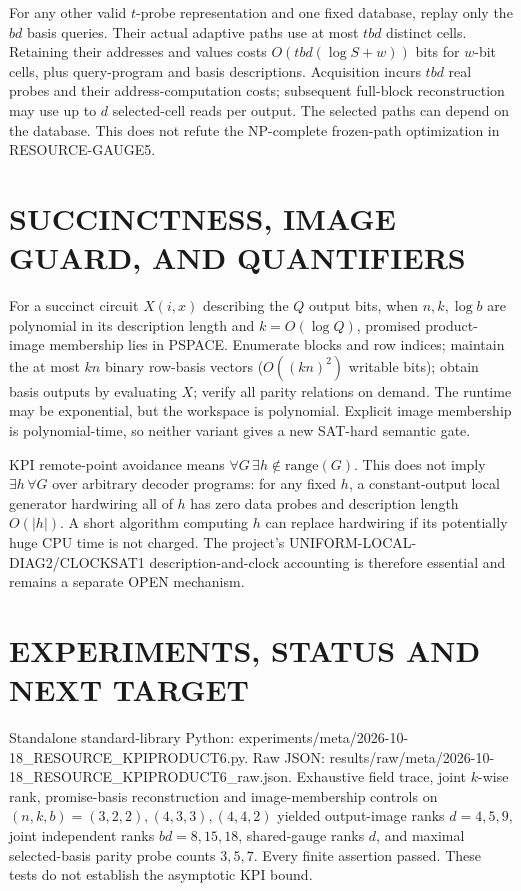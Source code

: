 \documentclass[11pt]{article}
\begin{document}
For any other valid $t$-probe representation and one fixed database, replay only the $bd$ basis queries. Their actual adaptive paths use at most $tbd$ distinct cells. Retaining their addresses and values costs $O(tbd(\log S+w))$ bits for $w$-bit cells, plus query-program and basis descriptions. Acquisition incurs $tbd$ real probes and their address-computation costs; subsequent full-block reconstruction may use up to $d$ selected-cell reads per output. The selected paths can depend on the database. This does not refute the NP-complete frozen-path optimization in RESOURCE-GAUGE5.

\section{SUCCINCTNESS, IMAGE GUARD, AND QUANTIFIERS}
For a succinct circuit $X(i,x)$ describing the $Q$ output bits, when $n,k,\log b$ are polynomial in its description length and $k=O(\log Q)$, promised product-image membership lies in PSPACE. Enumerate blocks and row indices; maintain the at most $kn$ binary row-basis vectors ($O((kn)^2)$ writable bits); obtain basis outputs by evaluating $X$; verify all parity relations on demand. The runtime may be exponential, but the workspace is polynomial. Explicit image membership is polynomial-time, so neither variant gives a new SAT-hard semantic gate.

KPI remote-point avoidance means $\forall G\,\exists h\notin\mathrm{range}(G)$. This does not imply $\exists h\,\forall G$ over arbitrary decoder programs: for any fixed $h$, a constant-output local generator hardwiring all of $h$ has zero data probes and description length $O(|h|)$. A short algorithm computing $h$ can replace hardwiring if its potentially huge CPU time is not charged. The project's UNIFORM-LOCAL-DIAG2/CLOCKSAT1 description-and-clock accounting is therefore essential and remains a separate OPEN mechanism.

\section{EXPERIMENTS, STATUS AND NEXT TARGET}
Standalone standard-library Python: experiments/meta/2026-10-18_RESOURCE_KPIPRODUCT6.py. Raw JSON: results/raw/meta/2026-10-18_RESOURCE_KPIPRODUCT6_raw.json. Exhaustive field trace, joint $k$-wise rank, promise-basis reconstruction and image-membership controls on $(n,k,b)=(3,2,2),(4,3,3),(4,4,2)$ yielded output-image ranks $d=4,5,9$, joint independent ranks $bd=8,15,18$, shared-gauge ranks $d$, and maximal selected-basis parity probe counts $3,5,7$. Every finite assertion passed. These tests do not establish the asymptotic KPI bound.
\end{document}

